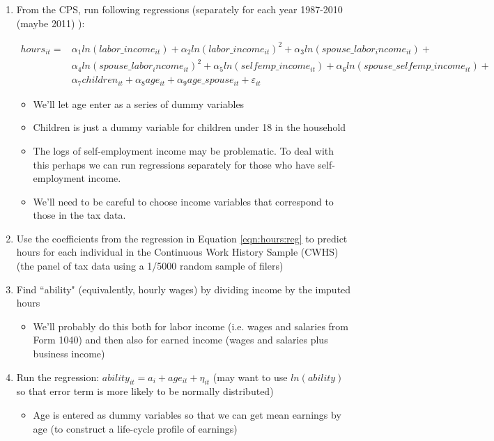 \documentclass[article,11pt,letterpaper,fleqn]{article}
\theoremstyle{definition}
\numberwithin{equation}{section}
\begin{document}
\begin{enumerate}
\item From the CPS, run following regressions (separately for each year 1987-2010 (maybe 2011) ):  

\begin{equation}
\label{eqn:hours_reg}
\begin{split}
hours_{it} = &  \alpha_{1}ln(labor\_income_{it}) + \alpha_{2}ln(labor\_income_{it})^{2} + \alpha_{3}ln(spouse\_labor_income_{it}) + \\
& \alpha_{4}ln(spouse\_labor_income_{it})^{2} + \alpha_{5}ln(selfemp\_income_{it}) + \alpha_{6}ln(spouse\_selfemp\_income_{it}) + \\
& \alpha_{7}children_{it} + \alpha_{8}age_{it} + \alpha_{9}age\_spouse_{it} + \varepsilon_{it}
\end{split}
\end{equation}
	\begin{itemize}
	\item We'll let age enter as a series of dummy variables
	\item Children is just a dummy variable for children under 18 in the household
	\item The logs of self-employment income may be problematic.  To deal with this perhaps we can run regressions separately for those who have self-employment income.
	\item We'll need to be careful to choose income variables that correspond to those in the tax data.
	\end{itemize}
\item Use the coefficients from the regression in Equation \ref{eqn:hours:reg} to predict hours for each individual in the Continuous Work History Sample (CWHS) (the panel of tax data using a 1/5000 random sample of filers)
\item  Find ``ability" (equivalently, hourly wages) by  dividing income by the imputed hours
	\begin{itemize}
	\item We'll probably do this both for labor income (i.e. wages and salaries from Form 1040) and then also for earned income (wages and salaries plus business income)
	\end{itemize}
\item Run the regression: $ability_{it} = a_{i} + age_{it} + \eta_{it}$ (may want to use $ln(ability)$ so that error term is more likely to be normally distributed)
	\begin{itemize}
	\item Age is entered as dummy variables so that we can get mean earnings by age (to construct a life-cycle profile of earnings)

\end{itemize}
\end{enumerate}
\end{document}
